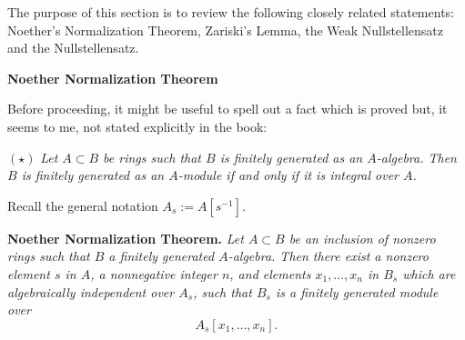 \documentclass[parskip=half,fontsize=12pt]{scrartcl}%
\begin{document}
The purpose of this section is to review the following closely related statements: Noether's Normalization Theorem, Zariski's Lemma, the Weak Nullstellensatz and the Nullstellensatz.

\textbf{\Large Noether Normalization Theorem}

Before proceeding, it might be useful to spell out a fact which is proved but, it seems to me, not stated explicitly in the book:

$(\star)$ \emph{Let $A\subset B$ be rings such that $B$ is finitely generated as an $A$-algebra. Then $B$ is finitely generated as an $A$-module if and only if it is integral over $A$.}

Recall the general notation $A_s:=A[s^{-1}]$.%

\textbf{Noether Normalization Theorem.} \emph{Let $A\subset B$ be an inclusion of nonzero rings such that $B$ a finitely generated $A$-algebra. Then there exist a nonzero element $s$ in $A$, a nonnegative integer $n$, and elements $x_1,\dots,x_n$ in $B_s$ which are algebraically independent over $A_s$, such that $B_s$ is a finitely generated module over} 
$$
A_s[x_1,\dots,x_n].
$$ 
\end{document}
